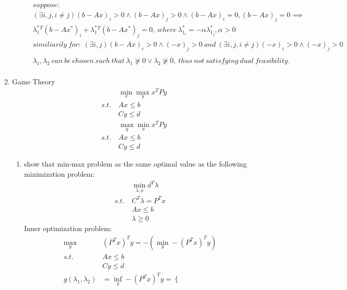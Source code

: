 \documentclass[12pt,letter]{article}
\begin{document}
\begin{enumerate}
\begin{itemize}
\begin{align*}
      &suppose:\\
      &(\exists i,j,i\not=j)(b-Ax)_i > 0 \wedge (b-Ax)_j > 0 \wedge (b-Ax)_i = 0, (b-Ax)_j = 0\implies\\
      &\lambda_1^*^T(b-Ax^*)_i + \lambda_1^*^T(b-Ax^*)_j = 0,\ where\ \lambda_{1_i}^* = -\alpha \lambda_{1_j}^*, \alpha > 0\\
      &similiarily\ for:\ (\exists i,j)(b-Ax)_i > 0 \wedge (-x)_j > 0\ and\ (\exists i,j,i\not=j)(-x)_i > 0 \wedge (-x)_j > 0\\
      \\
      &\lambda_1,\lambda_2\ can\ be\ chosen\ such\ that\ \lambda_1 \not\succeq 0 \vee \lambda_2 \not\succeq 0,\ thus\ not\ satisfying\ dual\ feasibility.\\
    \end{align*}
  \end{itemize}
  \pagebreak
\item Game Theory
  \begin{align*}
    &\min_x \max_y x^TPy\\
    s.t.\ &Ax \leq b\\
    &Cy \leq d
  \end{align*}
  \begin{align*}
      &\max_y \min_x x^TPy\\
      s.t.\ &Ax \leq b\\
      &Cy \leq d
    \end{align*}
  \begin{enumerate}
  \item show that min-max problem as the same optimal value as the following minimization problem:
    \begin{align*}
      &\min_{\lambda,x} d^T \lambda\\
      s.t.\ & C^T \lambda = P^Tx\\
      &Ax \leq b\\
      &\lambda \geq 0
    \end{align*}
    Inner optimization problem:
    \begin{align*}
      \max_y & (P^Tx)^T y = -(\min_y -(P^Tx)^T y)\\
      s.t.\ &Ax \leq b\\
             &Cy \leq d\\
      g(\lambda_1,\lambda_2) & = \inf_y -(P^Tx)^T y =
                           \begin{cases}

\end{cases}
\end{align*}
\end{enumerate}
\end{enumerate}
\end{document}

